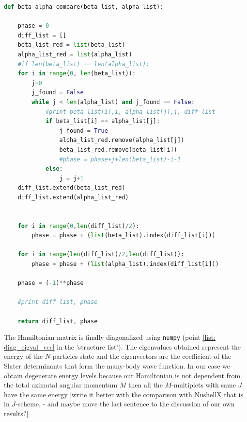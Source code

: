 \documentclass[twoside]{article}
\newcommand{\bra}[1]{\langle #1 |}
\newcommand{\ket}[1]{| #1 \rangle}
\begin{document}
\smallskip
\begin{lstlisting}[language=Python,label=compare, caption=\texttt{beta\_alpha\_compare} is a function in the module \texttt{compare.py} that makes a comparison between $\protect{\bra{\Phi_\beta}}$ and $\protect{\ket{\Phi_\alpha}}$ to determine their difference in terms of single-particle states. Should mention if ham.py is using this function (?)]
def beta_alpha_compare(beta_list, alpha_list):
    
    phase = 0
    diff_list = []
    beta_list_red = list(beta_list)
    alpha_list_red = list(alpha_list)
    #if len(beta_list) == len(alpha_list):
    for i in range(0, len(beta_list)):
        j=0
        j_found = False
        while j < len(alpha_list) and j_found == False:
            #print beta_list[i],i, alpha_list[j],j, diff_list
            if beta_list[i] == alpha_list[j]:
                j_found = True
                alpha_list_red.remove(alpha_list[j])
                beta_list_red.remove(beta_list[i])
                #phase = phase+j+len(beta_list)-i-1
            else:
                j = j+1
    diff_list.extend(beta_list_red)
    diff_list.extend(alpha_list_red)


    for i in range(0,len(diff_list)/2):
    	phase = phase + (list(beta_list).index(diff_list[i]))
 
    for i in range(len(diff_list)/2,len(diff_list)):
        phase = phase + (list(alpha_list).index(diff_list[i]))
        
    phase = (-1)**phase

    #print diff_list, phase
    
    return diff_list, phase

\end{lstlisting}

The Hamiltonian matrix is finally diagonalized using \texttt{numpy} (point \ref{list: diag_eigval_vec} in the 'structure list'). The eigenvalues obtained represent the energy of the $N$-particles state and the eigenvectors are the coefficient of the Slater determinants that form the many-body wave function. In our case we obtain degenerate energy levels because our Hamiltonian is not dependent from the total azimutal angular momentum $M$ then all the $M$-multiplets with same $J$ have the same energy [write it better with the comparison with NushellX that is in $J$-scheme. - and maybe move the last sentence to the discussion of our own results?]
\end{document}
